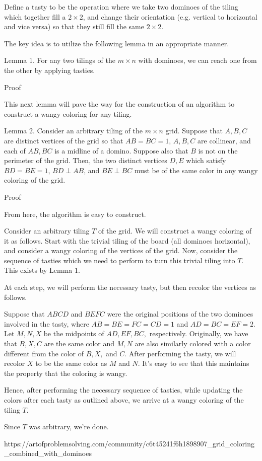\documentclass[a4paper]{article}
\begin{document}
\begin{question*}{}
{        Define a tasty to be the operation where we take two dominoes of the tiling which together fill a $2 \times 2$, and change their orientation (e.g. vertical to horizontal and vice versa) so that they still fill the same $2 \times 2.$

        The key idea is to utilize the following lemma in an appropriate manner.

        Lemma 1. For any two tilings of the $m \times n$ with dominoes, we can reach one from the other by applying tasties.

        Proof

        This next lemma will pave the way for the construction of an algorithm to construct a wangy coloring for any tiling.

        Lemma 2. Consider an arbitrary tiling of the $m \times n$ grid. Suppose that $A, B, C$ are distinct vertices of the grid so that $AB = BC = 1$, $A, B, C$ are collinear, and each of $AB, BC$ is a midline of a domino. Suppose also that $B$ is not on the perimeter of the grid. Then, the two distinct vertices $D, E$ which satisfy $BD = BE = 1$, $BD \perp AB$, and $BE \perp BC$ must be of the same color in any wangy coloring of the grid.

        Proof

        From here, the algorithm is easy to construct.

        Consider an arbitrary tiling $T$ of the grid. We will construct a wangy coloring of it as follows. Start with the trivial tiling of the board (all dominoes horizontal), and consider a wangy coloring of the vertices of the grid. Now, consider the sequence of tasties which we need to perform to turn this trivial tiling into $T.$ This exists by Lemma $1.$

        At each step, we will perform the necessary tasty, but then recolor the vertices as follows.

        Suppose that $ABCD$ and $BEFC$ were the original positions of the two dominoes involved in the tasty, where $AB = BE = FC = CD = 1$ and $AD = BC = EF = 2.$ Let $M, N, X$ be the midpoints of $AD, EF, BC,$ respectively. Originally, we have that $B, X, C$ are the same color and $M, N$ are also similarly colored with a color different from the color of $B, X,$ and $C$. After performing the tasty, we will recolor $X$ to be the same color as $M$ and $N.$ It's easy to see that this maintains the property that the coloring is wangy.

        Hence, after performing the necessary sequence of tasties, while updating the colors after each tasty as outlined above, we arrive at a wangy coloring of the tiling $T.$

        Since $T$ was arbitrary, we're done.

        }{%
        https://artofproblemsolving.com/community/c6t45241f6h1898907_grid_coloring_combined_with_dominoes
    }

    
\end{question*}
\end{document}
